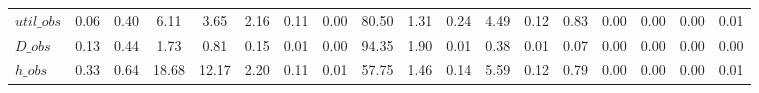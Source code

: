 \begin{center}
\begin{longtable}{lccccccccccccccccc}
$util\_obs      $	 & 	            0.06	 & 	            0.40	 & 	            6.11	 & 	            3.65	 & 	            2.16	 & 	            0.11	 & 	            0.00	 & 	           80.50	 & 	            1.31	 & 	            0.24	 & 	            4.49	 & 	            0.12	 & 	            0.83	 & 	            0.00	 & 	            0.00	 & 	            0.00	 & 	            0.01 \\ 
$D\_obs         $	 & 	            0.13	 & 	            0.44	 & 	            1.73	 & 	            0.81	 & 	            0.15	 & 	            0.01	 & 	            0.00	 & 	           94.35	 & 	            1.90	 & 	            0.01	 & 	            0.38	 & 	            0.01	 & 	            0.07	 & 	            0.00	 & 	            0.00	 & 	            0.00	 & 	            0.00 \\ 
$h\_obs         $	 & 	            0.33	 & 	            0.64	 & 	           18.68	 & 	           12.17	 & 	            2.20	 & 	            0.11	 & 	            0.01	 & 	           57.75	 & 	            1.46	 & 	            0.14	 & 	            5.59	 & 	            0.12	 & 	            0.79	 & 	            0.00	 & 	            0.00	 & 	            0.00	 & 	            0.01 \\ 
\end{longtable}
 \end{center}
